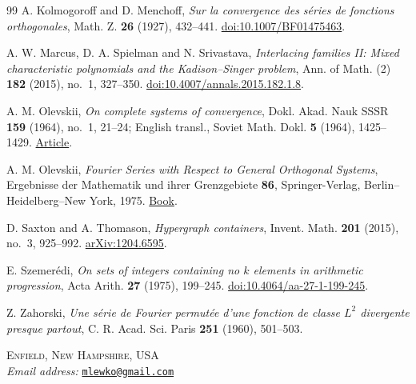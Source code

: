 \documentclass[11pt]{article}
\theoremstyle{remark}
\numberwithin{equation}{section}
\begin{document}
\begin{thebibliography}{99}
A. Kolmogoroff and D. Menchoff, \emph{Sur la convergence des s\'eries de fonctions orthogonales}, Math. Z. \textbf{26} (1927), 432--441.
\href{https://doi.org/10.1007/BF01475463}{doi:10.1007/BF01475463}.

A. W. Marcus, D. A. Spielman and N. Srivastava, \emph{Interlacing families II: Mixed characteristic polynomials and the Kadison--Singer problem}, Ann. of Math. (2) \textbf{182} (2015), no.~1, 327--350.
\href{https://doi.org/10.4007/annals.2015.182.1.8}{doi:10.4007/annals.2015.182.1.8}.

A. M. Olevskii, \emph{On complete systems of convergence}, Dokl. Akad. Nauk SSSR \textbf{159} (1964), no.~1, 21--24; English transl., Soviet Math. Dokl. \textbf{5} (1964), 1425--1429.
\href{https://www.mathnet.ru/eng/dan30299}{Article}.

A. M. Olevskii, \emph{Fourier Series with Respect to General Orthogonal Systems}, Ergebnisse der Mathematik und ihrer Grenzgebiete \textbf{86}, Springer-Verlag, Berlin--Heidelberg--New York, 1975.
\href{https://link.springer.com/book/9783642660580}{Book}.

D. Saxton and A. Thomason, \emph{Hypergraph containers}, Invent. Math. \textbf{201} (2015), no.~3, 925--992.
\href{https://arxiv.org/abs/1204.6595}{arXiv:1204.6595}.

E. Szemer\'edi, \emph{On sets of integers containing no $k$ elements in arithmetic progression}, Acta Arith. \textbf{27} (1975), 199--245.
\href{https://doi.org/10.4064/aa-27-1-199-245}{doi:10.4064/aa-27-1-199-245}.

Z. Zahorski, \emph{Une s\'erie de Fourier permut\'ee d'une fonction de classe $L^2$ divergente presque partout}, C. R. Acad. Sci. Paris \textbf{251} (1960), 501--503.

\end{thebibliography}

\medskip
\noindent\textsc{Enfield, New Hampshire, USA}\\[2pt]
\textit{Email address:} \href{mailto:mlewko@gmail.com}{\texttt{mlewko@gmail.com}}
\endgroup
\end{document}
